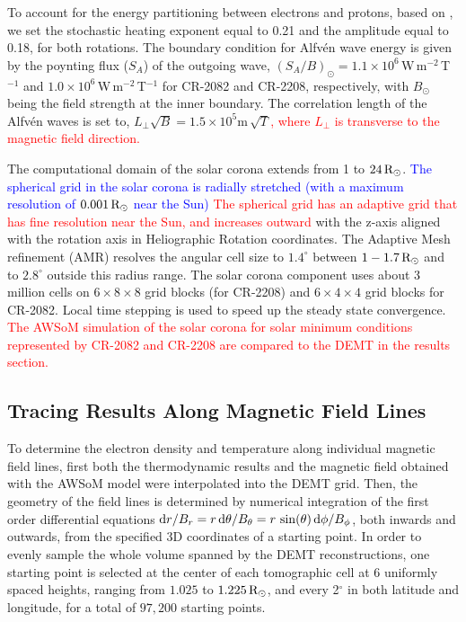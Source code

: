 \documentclass[namedreferences]{solarphysics}
\def\edit#1{\textcolor{Red}{#1}}
\def\del#1{\textcolor{Blue}{#1}}
\newcommand{\mdeg}{^\circ}
\newcommand{\mrsun}{{\rm R_\odot}}
\begin{document}
\begin{article}
To account for the energy partitioning between electrons and protons, based on \citet{Cha2011}, we set the stochastic heating exponent {equal to} 0.21 and the amplitude equal to {0.18, for both} rotations. The boundary condition for Alfv\'{e}n wave energy is given by the {poynting flux ($S_{A}$)} of the outgoing {wave, $({S_{A}/}{B})_{\odot} = 1.1\times 10^{6}$\,W\,m$^{-2}$\,T$^{-1}$ and $1.0\times 10^{6}$\,W\,m$^{-2}$\,T$^{-1}$ for CR-2082 and CR-2208, respectively, with $B_{\odot}$ being the field} strength at the inner boundary. The correlation length of the Alfv\'{e}n waves is set {to, $L_{\perp} \sqrt{B} = 1.5 \times 10^{5}$m\,$\sqrt{T}$}\edit{, where $L_{\perp}$ is transverse to the magnetic field direction.}

{The computational domain of the solar corona} extends from 1 to {$24\,\mrsun$}. \del{The spherical grid in the solar corona is radially stretched (with a maximum resolution {of $0.001\,\mrsun$} near the Sun)} \edit{The spherical grid has an adaptive grid that has fine resolution near the Sun, and increases outward} with the z-axis aligned with the rotation axis in Heliographic Rotation coordinates. The Adaptive Mesh refinement (AMR) resolves the angular cell size to $1.4\mdeg$ between $1 - 1.7\,\mrsun$ and to $2.8\mdeg$ outside this radius range. The solar corona component uses about 3 million cells on $6 \times 8 \times 8$ grid blocks (for CR-2208) and $6 \times 4 \times 4$ grid blocks for CR-2082. Local time stepping is used to speed up the steady state convergence. \edit{The AWSoM simulation of the solar corona for solar minimum conditions represented by CR-2082 and CR-2208 are compared to the DEMT in the results section.}

\subsection{{Tracing Results Along Magnetic Field Lines}}\label{trace} 

{To determine} the electron density and temperature along individual magnetic field lines, first both the thermodynamic results and the magnetic field obtained with the AWSoM model were interpolated into the DEMT grid. Then, the geometry of the field lines is determined by numerical integration of the first order differential equations  ${\rm d}r/B_r = {r\,{\rm d}\theta}/B_\theta = r\,\sin(\theta)\,{\rm d}\phi/B_\phi$, both inwards and outwards, from the specified 3D coordinates of a starting point. In order to evenly sample the whole volume spanned by the DEMT reconstructions, one starting point is selected at the center of each tomographic cell at 6 uniformly spaced heights, ranging from $1.025$ to $1.225\,\mrsun$, and every 2$^\circ$ in both latitude and longitude, {for a total of $97,200$ starting points.}


\end{article}
\end{document}
